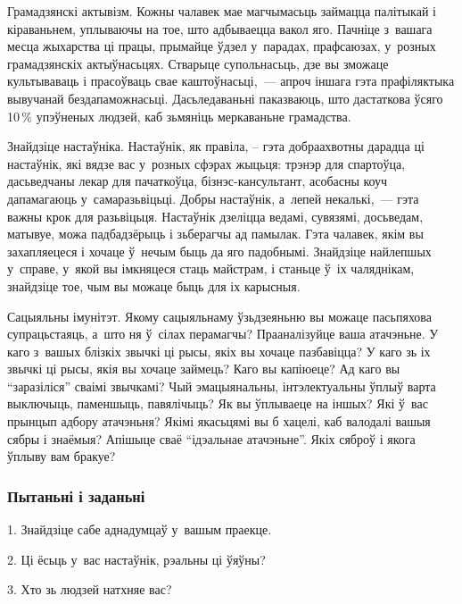 Грамадзянскі актывізм. Кожны чалавек мае магчымасьць займацца палітыкай і кіраваньнем, уплываючы на тое, што адбываецца вакол яго. Пачніце з~вашага месца жыхарства ці працы, прымайце ўдзел у~парадах, прафсаюзах, у~розных грамадзянскіх актыўнасьцях. Стварыце супольнасьць, дзе вы зможаце культываваць і прасоўваць свае каштоўнасьці,~--- апроч іншага гэта прафіляктыка вывучанай бездапаможнасьці. Дасьледаваньні паказваюць, што дастаткова ўсяго 10\,\% упэўненых людзей, каб зьмяніць меркаваньне грамадства.

Знайдзіце настаўніка. Настаўнік, як правіла, -- гэта добраахвотны дарадца ці настаўнік, які вядзе вас у~розных сфэрах жыцьця: трэнэр для спартоўца, дасьведчаны лекар для пачаткоўца, бізнэс-кансультант, асобасны коуч дапамагаюць у~самаразьвіцьці. Добры настаўнік, а~лепей некалькі,~--- гэта важны крок для разьвіцьця. Настаўнік дзеліцца ведамі, сувязямі, досьведам, матывуе, можа падбадзёрыць і зьберагчы ад памылак. Гэта чалавек, якім вы захапляецеся і хочаце ў~нечым быць да яго падобнымі. Знайдзіце найлепшых у~справе, у~якой вы імкняцеся стаць майстрам, і станьце ў~іх чаляднікам, знайдзіце тое, чым вы можаце быць для іх карысныя.

Сацыяльны імунітэт. Якому сацыяльнаму ўзьдзеяньню вы можаце пасьпяхова супрацьстаяць, а~што ня ў~сілах перамагчы? Прааналізуйце ваша атачэньне. У каго з~вашых блізкіх звычкі ці рысы, якіх вы хочаце пазбавіцца? У каго зь іх звычкі ці рысы, якія вы хочаце займець? Каго вы капіюеце? Ад каго вы ``заразіліся'' сваімі звычкамі? Чый эмацыянальны, інтэлектуальны ўплыў варта выключыць, паменшыць, павялічыць? Як вы ўплываеце на іншых? Які ў~вас прынцып адбору атачэньня? Якімі якасьцямі вы б хацелі, каб валодалі вашыя сябры і знаёмыя? Апішыце сваё ``ідэальнае атачэньне''. Якіх сяброў і якога ўплыву вам бракуе?

\subsubsection{Пытаньні і заданьні}

1. Знайдзіце сабе аднадумцаў у~вашым праекце.

2. Ці ёсьць у~вас настаўнік, рэальны ці ўяўны?

3. Хто зь людзей натхняе вас?
